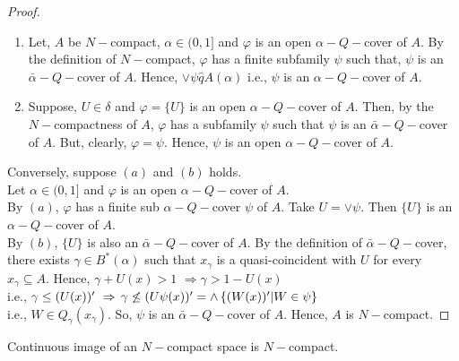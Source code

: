 \documentclass[../main-sheet.tex]{subfiles}
\begin{document}
\begin{proof}
    \begin{enumerate}[label=(\alph*)]
        \item Let, \(A \) be \(N-\)compact, \(\alpha\in (0,1]\) and \(\varphi\) is an open \(\alpha-Q-\)cover of \(A \). By the definition of \(N-\)compact, \(\varphi\) has a finite subfamily \(\psi \) such that, \(\psi \) is an \(\bar{\alpha}-Q-\)cover of \(A \). Hence, \(\vee \psi\hat{q } A(\alpha)\) i.e., \(\psi\) is an \(\alpha-Q-\)cover of \(A \).
        \item Suppose, \(U\in \delta\) and \(\varphi=\{U \}\) is an open \(\alpha-Q-\)cover of \(A \). Then, by the \(N-\)compactness of \(A \), \(\varphi \) has a subfamily \(\psi\) such that \(\psi\) is an \(\bar{\alpha}-Q-\)cover of \(A \). But, clearly, \(\varphi=\psi\). Hence, \(\psi\) is an open \(\alpha-Q-\)cover of \(A \).
    \end{enumerate}
        
        Conversely, suppose \((a )\) and \((b )\) holds.\\
        Let \(\alpha\in (0,1]\) and \(\varphi\) is an open \(\alpha-Q-\)cover of \(A \).\\
        By \((a )\), \(\varphi\) has a finite sub \(\alpha-Q-\)cover \(\psi\) of \(A \). Take \(U=\vee \psi\). Then \(\{U \}\) is an \(\alpha-Q-\)cover of \(A \).\\
        By \((b )\), \(\{U \}\) is also an \(\bar{\alpha}-Q-\)cover of \(A \). By the definition of \(\bar{\alpha}-Q-\)cover, there exists \(\gamma\in B^*(\alpha)\) such that \(x_\gamma\) is a quasi-coincident with \(U \) for every \(x_\gamma\subseteq A \). Hence, \(\gamma+U(x)>1\) \(\Rightarrow \gamma>1-U(x )\)\\
        i.e., \(\gamma\leq (U(x))'\,\,\Rightarrow\,\gamma\not\leq (U\psi(x))'=\wedge\left\{(W(x))'|W\in \psi\right\}\)\\
        i.e., \(W\in Q_{\gamma}(x_\gamma)\). So, \(\psi\) is an \(\bar{\alpha}-Q-\)cover of \(A \). Hence, \(A \) is \(N-\)compact.
\end{proof}
\begin{thm}
    Continuous image of an \(N-\)compact space is \(N-\)compact.
\end{thm}
\end{document}
